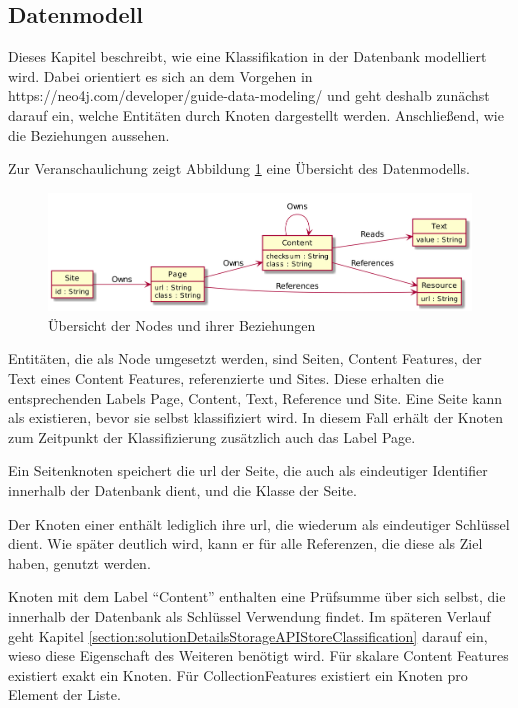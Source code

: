 \subsection{Datenmodell}
    Dieses Kapitel beschreibt, wie eine Klassifikation in der Datenbank modelliert wird.
    Dabei orientiert es sich an dem Vorgehen in https://neo4j.com/developer/guide-data-modeling/
    und geht deshalb zunächst darauf ein, welche Entitäten durch Knoten dargestellt werden.
    Anschließend, wie die Beziehungen aussehen.

    Zur Veranschaulichung zeigt Abbildung \ref{image:dbDataModelOverview} eine Übersicht des Datenmodells.

    \begin{figure}
        \centering
        \includegraphics[width=\textwidth]{../resources/db-data-model/nodes.png}
        \caption{Übersicht der Nodes und ihrer Beziehungen}
        \label{image:dbDataModelOverview}
    \end{figure}

    Entitäten, die als Node umgesetzt werden, sind Seiten, Content Features,
    der Text eines Content Features, referenzierte {\resources} und Sites.
    Diese erhalten die entsprechenden Labels Page, Content, Text, Reference und Site.
    Eine Seite kann als {\resource} existieren, bevor sie selbst klassifiziert wird.
    In diesem Fall erhält der Knoten zum Zeitpunkt der Klassifizierung zusätzlich auch das Label Page.

    Ein Seitenknoten speichert die \gls{url} der Seite, die auch als eindeutiger Identifier innerhalb der Datenbank dient,
    und die Klasse der Seite.

    Der Knoten einer {\resource} enthält lediglich ihre \gls{url}, die wiederum als eindeutiger Schlüssel dient.
    Wie später deutlich wird, kann er für alle Referenzen, die diese {\resource} als Ziel haben, genutzt werden.

    Knoten mit dem Label "`Content"' enthalten eine Prüfsumme über sich selbst, die innerhalb der Datenbank als Schlüssel Verwendung findet.
    Im späteren Verlauf geht Kapitel \ref{section:solutionDetailsStorageAPIStoreClassification} darauf ein,
    wieso diese Eigenschaft des Weiteren benötigt wird.
    Für skalare Content Features existiert exakt ein Knoten.
    Für CollectionFeatures existiert ein Knoten pro Element der Liste.

